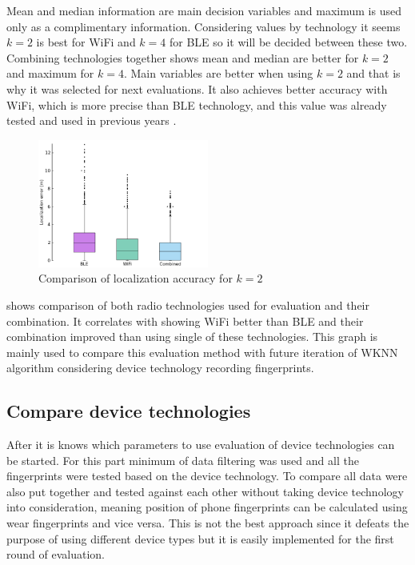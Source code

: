 Mean and median information are main decision variables and maximum is used only as a complimentary information. Considering values by technology it seems $k = 2$ is best for WiFi and $k = 4$ for BLE so it will be decided between these two. Combining technologies together shows mean and median are better for $k = 2$ and maximum for $k = 4$. Main variables are better when using $k = 2$ and that is why it was selected for next evaluations. It also achieves better accuracy with WiFi, which is more precise than BLE technology, and this value was already tested and used in previous years \cite{IILUBLEB}.

\begin{figure}[h!]
	\begin{centering}
		\includegraphics[width=0.5\textwidth]{img/wknn_errors_classic}
		\par\end{centering}
	\caption{Comparison of localization accuracy for $k = 2$}
	\label{fig04c06}
\end{figure}

 shows comparison of both radio technologies used for evaluation and their combination. It correlates with  showing WiFi better than BLE and their combination improved than using single of these technologies. This graph is mainly used to compare this evaluation method with future iteration of WKNN algorithm considering device technology recording fingerprints.  

\subsection{Compare device technologies}\label{sec:CompareDeviceTechnologies}
After it is knows which parameters to use evaluation of device technologies can be started. For this part minimum of data filtering was used and all the fingerprints were tested based on the device technology. To compare all data were also put together and tested against each other without taking device technology into consideration, meaning position of phone fingerprints can be calculated using wear fingerprints and vice versa. This is not the best approach since it defeats the purpose of using different device types but it is easily implemented for the first round of evaluation.

